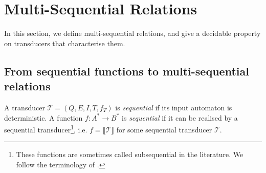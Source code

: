 \documentclass[envcountsame]{llncs}
\newcommand\inter[1]{\llbracket #1 \rrbracket}
\begin{document}
\vspace{-3mm}
\section{Multi-Sequential Relations}
\vspace{-2mm}

In this section, we define multi-sequential relations, and give a
decidable property on transducers that characterise them.

\vspace{-4mm}
\subsection{From sequential functions to multi-sequential relations}
\vspace{-2mm}

A transducer $\mathcal{T} = (Q, E, I, T, f_T)$ is
\emph{sequential} if its input automaton is deterministic. A function $f:A^*\rightarrow B^*$ is
\emph{sequential} if it can be realised by a sequential
transducer\footnote{These functions are sometimes called subsequential
in the literature. We follow the terminology of
\cite{DBLP:books/daglib/0023547}.}, i.e. $f = \inter{\mathcal{T}}$ for
some sequential transducer $\mathcal{T}$. 
\end{document}
